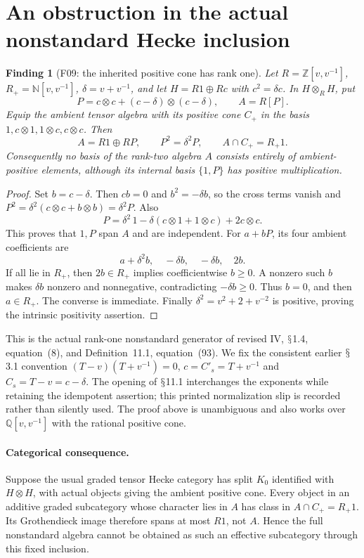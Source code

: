 \documentclass[11pt,a4paper]{article}
\newcommand{\Q}{\mathbb Q}\newcommand{\Z}{\mathbb Z}\newcommand{\C}{\mathbb C}\newcommand{\N}{\mathbb N}\newcommand{\F}{\mathbb F}
\renewcommand{\S}{\ensuremath{\mathsection}}
\newcommand{\fid}[1]{\textsf{#1}}\newcommand{\gate}[1]{\textsf{#1}}
\theoremstyle{named}\newtheorem{finding}{Finding}[section]
\theoremstyle{definition}\newtheorem{definition}[finding]{Definition}
\theoremstyle{remark}\newtheorem{remark}[finding]{Remark}
\begin{document}
\section{An obstruction in the actual nonstandard Hecke inclusion}\label{sec:ambient}
\begin{finding}[\fid{F09}: the inherited positive cone has rank one]\label{f:hecke}
Let $R=\Z[v,v^{-1}]$, $R_+=\N[v,v^{-1}]$, $\delta=v+v^{-1}$, and let $H=R1\oplus Rc$ with $c^2=\delta c$. In $H\otimes_RH$, put
\[
 P=c\otimes c+(c-\delta)\otimes(c-\delta),\qquad A=R[P].
\]
Equip the ambient tensor algebra with its positive cone $C_+$ in the basis
$1,c\otimes1,1\otimes c,c\otimes c$. Then
\begin{equation}\label{eq:cone}
 A=R1\oplus RP,\qquad P^2=\delta^2P,\qquad A\cap C_+=R_+1.
\end{equation}
Consequently no basis of the rank-two algebra $A$ consists entirely of ambient-positive elements, although its internal basis $\{1,P\}$ has positive multiplication.
\end{finding}
\begin{proof}
Set $b=c-\delta$. Then $cb=0$ and $b^2=-\delta b$, so the cross terms vanish and
$P^2=\delta^2(c\otimes c+b\otimes b)=\delta^2P$. Also
\[
 P=\delta^2\,1-\delta(c\otimes1+1\otimes c)+2c\otimes c.
\]
This proves that $1,P$ span $A$ and are independent. For $a+bP$, its four ambient coefficients are
\[
 a+\delta^2b,\quad-\delta b,\quad-\delta b,\quad2b.
\]
If all lie in $R_+$, then $2b\in R_+$ implies coefficientwise $b\ge0$. A nonzero such $b$ makes $\delta b$ nonzero and nonnegative, contradicting $-\delta b\ge0$. Thus $b=0$, and then $a\in R_+$. The converse is immediate. Finally $\delta^2=v^2+2+v^{-2}$ is positive, proving the intrinsic positivity assertion.
\end{proof}
This is the actual rank-one nonstandard generator of revised IV, \S1.4, equation~(8), and Definition~11.1, equation~(93). We fix the consistent earlier \S3.1 convention
$(T-v)(T+v^{-1})=0$, $c=C'_s=T+v^{-1}$ and $C_s=T-v=c-\delta$.
The opening of \S11.1 interchanges the exponents while retaining the idempotent assertion; this printed normalization slip is recorded rather than silently used. The proof above is unambiguous and also works over $\Q[v,v^{-1}]$ with the rational positive cone.

\paragraph{Categorical consequence.}
Suppose the usual graded tensor Hecke category has split $K_0$ identified with $H\otimes H$, with actual objects giving the ambient positive cone. Every object in an additive graded subcategory whose character lies in $A$ has class in $A\cap C_+=R_+1$. Its Grothendieck image therefore spans at most $R1$, not $A$. Hence the full nonstandard algebra cannot be obtained as such an effective subcategory through this fixed inclusion.
\end{document}
